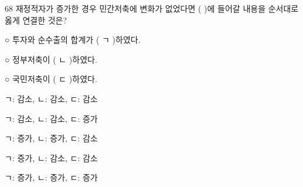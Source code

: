 \begin{question}{68}
재정적자가 증가한 경우 민간저축에 변화가 없었다면 ( )에 들어갈 내용을 순서대로 옳게 연결한 것은?
\begin{framedtext}
○ 투자와 순수출의 합계가 ( ㄱ )하였다. \par
○ 정부저축이 ( ㄴ )하였다. \par
○ 국민저축이 ( ㄷ )하였다.
\end{framedtext}
\begin{choices}
  \item ㄱ: 감소, ㄴ: 감소, ㄷ: 감소
  \item ㄱ: 감소, ㄴ: 감소, ㄷ: 증가
  \item ㄱ: 증가, ㄴ: 증가, ㄷ: 감소
  \item ㄱ: 증가, ㄴ: 감소, ㄷ: 감소
  \item ㄱ: 증가, ㄴ: 증가, ㄷ: 증가
\end{choices}
\end{question}

